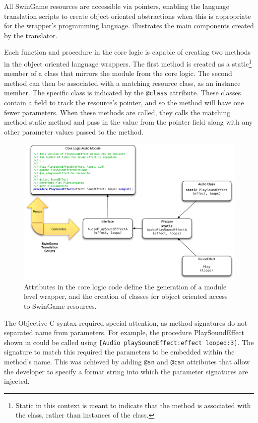 All SwinGame resources are accessible via pointers, enabling the language translation scripts to create object oriented abstractions when this is appropriate for the wrapper's programming language.  illustrates the main components created by the translator. 

Each function and procedure in the core logic is capable of creating two methods in the object oriented language wrappers. The first method is created as a static\footnote{Static in this context is meant to indicate that the method is associated with the class, rather than instances of the class.} member of a class that mirrors the module from the core logic. The second method can then be associated with a matching resource class, as an instance member. The specific class is indicated by the \texttt{@class} attribute. These classes contain a field to track the resource's pointer, and so the method will have one fewer parameters. When these methods are called, they calls the matching method static method and pass in the value from the pointer field along with any other parameter values passed to the method.

\begin{figure}[thbp]
  \centering
  \includegraphics[width=\textwidth]{SwinGameWrapperOutput}
  \caption{Attributes in the core logic code define the generation of a module level wrapper, and the creation of classes for object oriented access to SwinGame resources.}
  \label{fig:swingame_wrapper_output}
\end{figure}

The Objective C syntax required special attention, as method signatures do not separated name from parameters. For example, the procedure PlaySoundEffect shown in  could be called using \texttt{[Audio playSoundEffect:effect looped:3]}. The signature to match this required the parameters to be embedded within the method's name. This was achieved by adding \texttt{@sn} and \texttt{@csn} attributes that allow the developer to specify a format string into which the parameter signatures are injected.

